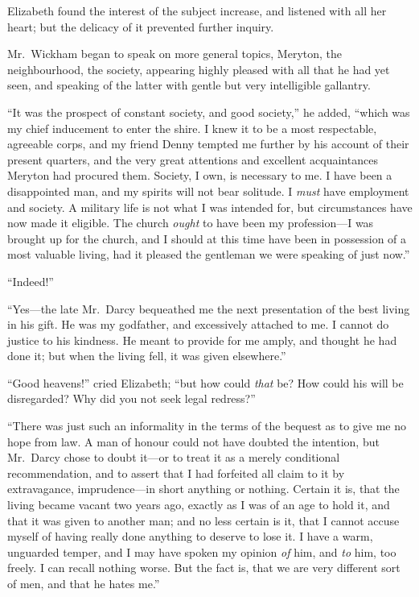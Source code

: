Elizabeth found the interest of the subject increase, and listened
with all her heart; but the delicacy of it prevented further inquiry.

Mr.\ Wickham began to speak on more general topics, Meryton,
the neighbourhood, the society, appearing highly pleased with all
that he had yet seen, and speaking of the latter with gentle but
very intelligible gallantry.

``It was the prospect of constant society, and good society,'' he
added, ``which was my chief inducement to enter the \gdash{}shire.
I knew it to be a most respectable, agreeable corps, and my
friend Denny tempted me further by his account of their
present quarters, and the very great attentions and excellent
acquaintances Meryton had procured them.  Society, I own, is
necessary to me.  I have been a disappointed man, and my spirits
will not bear solitude.  I \emph{must} have employment and society.
A military life is not what I was intended for, but circumstances
have now made it eligible.  The church \emph{ought} to have been
my profession---I was brought up for the church, and I should at
this time have been in possession of a most valuable living, had
it pleased the gentleman we were speaking of just now.''

``Indeed!''

``Yes---the late Mr.\ Darcy bequeathed me the next presentation
of the best living in his gift.  He was my godfather, and
excessively attached to me.  I cannot do justice to his kindness.
He meant to provide for me amply, and thought he had done it;
but when the living fell, it was given elsewhere.''

``Good heavens!'' cried Elizabeth; ``but how could \emph{that} be?
How could his will be disregarded?  Why did you not seek legal
redress?''

``There was just such an informality in the terms of the bequest
as to give me no hope from law.  A man of honour could not have
doubted the intention, but Mr.\ Darcy chose to doubt it---or to
treat it as a merely conditional recommendation, and to assert that
I had forfeited all claim to it by extravagance, imprudence---in
short anything or nothing.  Certain it is, that the living became
vacant two years ago, exactly as I was of an age to hold it, and
that it was given to another man; and no less certain is it, that
I cannot accuse myself of having really done anything to deserve
to lose it.  I have a warm, unguarded temper, and I may have
spoken my opinion \emph{of} him, and \emph{to} him, too freely.  I can recall
nothing worse.  But the fact is, that we are very different sort
of men, and that he hates me.''

